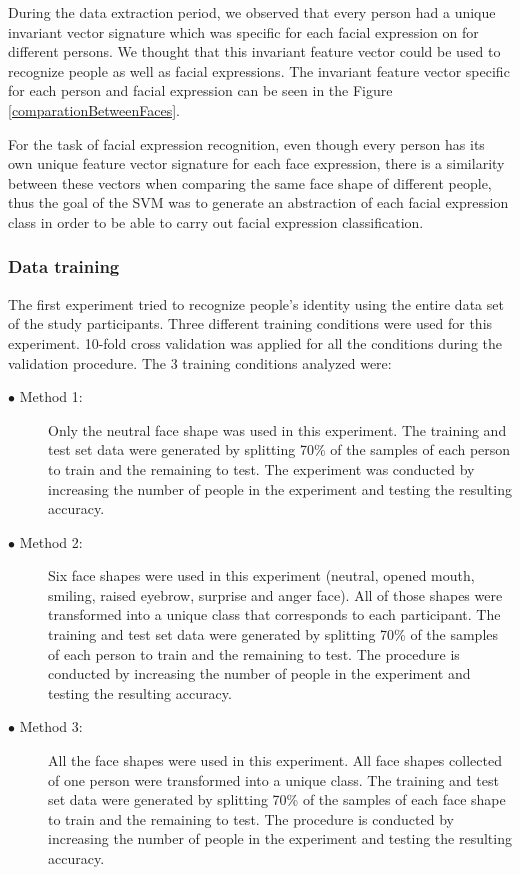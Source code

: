 \documentclass[]{article}
\begin{document}
During the data extraction period, we observed that every person had a unique invariant vector signature which was
specific for each facial expression on for different persons. We thought that this invariant feature vector could be
used to recognize people as well as facial expressions. The invariant feature vector specific for each person and
facial expression can be seen in the Figure \ref{comparationBetweenFaces}.

For the task of facial expression recognition, even though every person has its own unique feature vector signature for
each face expression, there is a similarity between these vectors when comparing the same face shape of different
people, thus the goal of the SVM was to generate an abstraction of each facial expression class in order to be able to
carry out facial expression classification.

\subsubsection{Data training}
The first experiment tried to recognize people's identity using the entire data set of the study participants. Three
different training conditions were used for this experiment. 10-fold cross validation was applied for all the conditions
during the validation procedure. The 3 training conditions analyzed were:

\begin{description}
\item[$\bullet$ Method 1:] Only the neutral face shape was used in this
experiment.  The training and test set data were generated by splitting 70\% of
the samples of each person to train and the remaining to test. The experiment was conducted by increasing the number 
of people in the experiment and testing the resulting accuracy.
\item[$\bullet$ Method 2:]Six face shapes were used in this experiment (neutral,
opened mouth, smiling, raised eyebrow, surprise and anger face). All of those
shapes were transformed into a unique class that corresponds to each
participant. The training and test set data were generated by splitting 70\% of
the samples of each person to train and the remaining to test. The procedure is conducted by
increasing the number of people in the experiment and testing the resulting
accuracy.
\item[$\bullet$ Method 3:]All the face shapes were used in this experiment. All
face shapes collected of one person were transformed into a unique class. The
training and test set data were generated by splitting 70\% of the samples of
each face shape to train and the remaining to test. The procedure is conducted
by increasing the number of people in the experiment and testing the resulting
accuracy.
\end{description}
\end{document}
